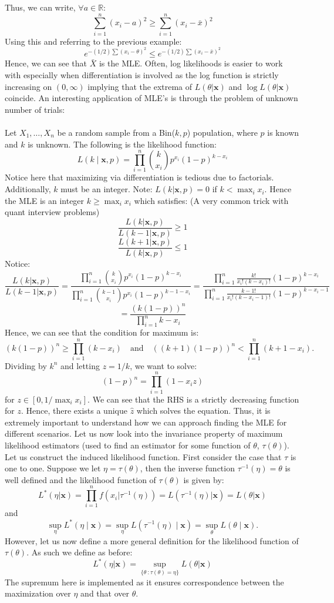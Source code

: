 \documentclass[12pt]{article}
\begin{document}
Thus, we can write, $\forall a \in \mathbb{R}$:
\[\sum_{i= 1}^{n}(x_i - a)^2 \geq \sum_{i= 1}^{n}(x_i -\bar{x})^2\]
Using this and referring to the previous example:
\[e^{-(1/2)\sum(x_i - \theta)^2}\leq e^{-(1/2)\sum(x_i - \bar{x})^2}\]
Hence, we can see that $\bar{X}$ is the MLE. Often, log likelihoods is easier to work with especially when differentiation is involved as the log function is strictly increasing on $(0, 
\infty)$ implying that the extrema of $L(\theta| \mathbf{x})$ and $\log L(\theta | \mathbf{x})$ coincide. An interesting application of MLE's is through the problem of unknown number of trials:\\
\\
Let $X_1, \dots, X_n$ be a random sample from a Bin($k,p$) population, where $p$ is known and $k$ is unknown. The following is the likelihood function:
\[
L(k \mid \mathbf{x}, p) = \prod_{i=1}^{n} \binom{k}{x_i} p^{x_i} (1 - p)^{k - x_i}
\]
Notice here that maximizing via differentiation is tedious due to factorials. Additionally, $k$ must be an integer. Note: $L(k|\mathbf{x}, p) = 0$ if $k < \max_i x_i$. Hence the MLE is an integer $k \geq \max_i x_i$ which satisfies:
(A very common trick with quant interview problems)
\[\frac{L(k|\mathbf{x}, p)}{L(k-1|\mathbf{x}, p)} \geq 1\] 
\[\frac{L(k+1|\mathbf{x}, p)}{L(k|\mathbf{x}, p)} \leq 1\]
Notice:
\[\frac{L(k|\mathbf{x}, p)}{L(k-1|\mathbf{x}, p)} = \frac{\prod_{i=1}^{n} \binom{k}{x_i} p^{x_i} (1 - p)^{k - x_i}}{\prod_{i=1}^{n} \binom{k-1}{x_i} p^{x_i} (1 - p)^{k -1- x_i}} = \frac{\prod_{i=1}^{n} \frac{k!}{x_i!(k-x_i)!} (1 - p)^{k - x_i}}{\prod_{i=1}^{n} \frac{k-1!}{x_i!(k-x_i-1)!} (1 - p)^{k - x_i-1}}\]
\[= \frac{(k(1-p))^n}{\prod_{i=1}^{n}k-x_i}\]
Hence, we can see that the condition for  maximum is:
\[
(k(1 - p))^n \geq \prod_{i = 1}^{n} (k - x_i)
\quad \text{and} \quad
((k + 1)(1 - p))^n < \prod_{i = 1}^{n} (k + 1 - x_i).
\]
Dividing by \(k^n\) and letting \(z = 1/k\), we want to solve:
\[
(1 - p)^n = \prod_{i = 1}^{n} (1 - x_i z)
\]
for $z \in [0,1/\max_ix_i]$. We can see that the RHS is a strictly decreasing function for $z$. Hence, there exists a unique $\hat{z}$ which solves the equation. Thus, it is extremely important to understand how we can approach finding the MLE for different scenarios. Let us now look into the invariance property of maximum likelihood estimators (used to find an estimator for some function of $\theta$, $\tau(\theta)$). Let us construct the induced likelihood function. First consider the case that $\tau$ is one to one. Suppose we let $\eta = \tau (\theta)$, then the inverse function $\tau^{-1}(\eta) = \theta$ is well defined and the likelihood function of $\tau(\theta)$ is given by:
\[L^*(\eta | \mathbf{x}) = \prod_{i=1}^nf(x_i|\tau^{-1}(\eta)) = L(\tau^{-1}(\eta)|\mathbf{x}) = L(\theta | \mathbf{x})\]
and
\[
\sup_{\eta} L^*(\eta \mid \mathbf{x}) = \sup_{\eta} L(\tau^{-1}(\eta) \mid \mathbf{x}) = \sup_{\theta} L(\theta \mid \mathbf{x}).
\]
However, let us now define a more general definition for the likelihood function of $\tau(\theta)$. As such we define as before:
\[
L^*(\eta | \mathbf{x}) = \sup_{\{\theta\ : \tau(\theta) = \eta\}} L(\theta | \mathbf{x})\]
The supremum here is implemented as it ensures correspondence between the maximization over $\eta$ and that over $\theta$.
\end{document}
